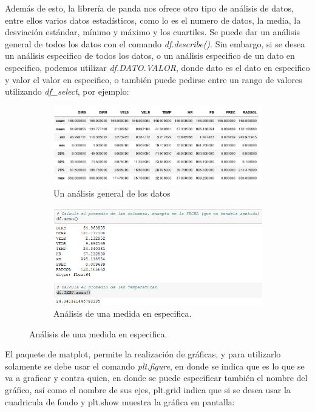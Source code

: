 \documentclass[12pt]{article}
\begin{document}
Además de esto, la librería de panda nos ofrece otro tipo de análisis de datos, entre ellos varios datos estadísticos, como lo es el numero de datos, la media, la desviación estándar, mínimo y máximo y los cuartiles. Se puede dar un análisis general de todos los datos con el comando \textit{df.describe()}. Sin embargo, si se desea un análisis especifico de todos los datos, o un análisis especifico de un dato en especifico, podemos utilizar \textit{df.DATO.VALOR}, donde dato es el dato en especifico y valor el valor en especifico, o también puede pedirse entre un rango de valores utilizando \textit{df\_select}, por ejemplo: \\

\begin{figure}[h!]
\begin{subfigure}{.5\textwidth}
  \centering
  \includegraphics[width=.8\linewidth]{Estad1.png}
  \caption{Un análisis general de los datos}
  \label{fig:sfig1}
\end{subfigure}%
\begin{subfigure}{.5\textwidth}
  \centering
  \includegraphics[width=.8\linewidth]{Estad2.png}
  \caption{Análisis de una medida en especifica.}
  \label{fig:sfig2}
\end{subfigure}
\end{figure}

El paquete de matplot, permite la realización de gráficas, y para utilizarlo solamente se debe usar el comando \textit{plt.figure}, en donde se indica que es lo que se va a graficar y contra quien, en donde se puede especificar también el nombre del gráfico, así como el nombre de sus ejes, plt.grid indica que si se desea usar la cuadricula de fondo y plt.show muestra la gráfica en pantalla: 
\end{document}
